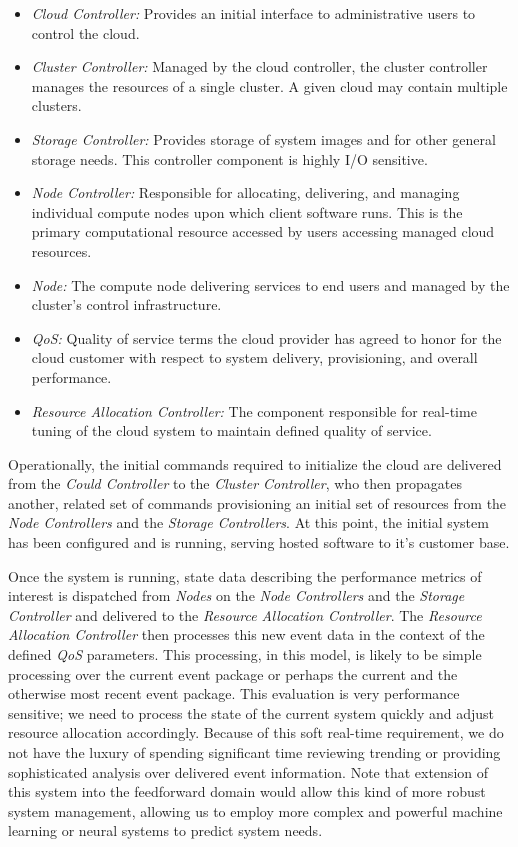 \documentclass[times, 10pt,twocolumn]{article}
\begin{document}
\begin{itemize}
\item \textit{Cloud Controller:} Provides an initial interface to administrative users to control the cloud.
\item \textit{Cluster Controller:} Managed by the cloud controller, the cluster controller manages the resources of a single cluster. A given cloud may contain multiple clusters.
\item \textit{Storage Controller:} Provides storage of system images and for other general storage needs.  This controller component is highly I/O sensitive.
\item \textit{Node Controller:} Responsible for allocating, delivering, and managing individual compute nodes upon which client software runs.  This is the primary computational resource accessed by users accessing managed cloud resources.
\item \textit{Node:} The compute node delivering services to end users and managed by the cluster's control infrastructure.
\item \textit{QoS:} Quality of service terms the cloud provider has agreed to honor for the cloud customer with respect to system delivery, provisioning, and overall performance.
\item \textit{Resource Allocation Controller:} The component responsible for real-time tuning of the cloud system to maintain defined quality of service.
\end{itemize}

Operationally, the initial commands required to initialize the cloud are delivered from the \textit{Could Controller} to the \textit{Cluster Controller}, who then propagates another, related set of commands provisioning an initial set of resources from the \textit{Node Controllers} and the \textit{Storage Controllers}.  At this point, the initial system has been configured and is running, serving hosted software to it's customer base.

Once the system is running, state data describing the performance metrics of interest is dispatched from \textit{Nodes} on the \textit{Node Controllers} and the \textit{Storage Controller} and delivered to the \textit{Resource Allocation Controller}.  The \textit{Resource Allocation Controller} then processes this new event data in the context of the defined \textit{QoS} parameters.  This processing, in this model, is likely to be simple processing over the current event package or perhaps the current and the otherwise most recent event package.  This evaluation is very performance sensitive; we need to process the state of the current system quickly and adjust resource allocation accordingly.  Because of this soft real-time requirement, we do not have the luxury of spending significant time reviewing trending or providing sophisticated analysis over delivered event information.  Note that extension of this system into the feedforward domain would allow this kind of more robust system management, allowing us to employ more complex and powerful machine learning or neural systems to predict system needs.
\end{document}

